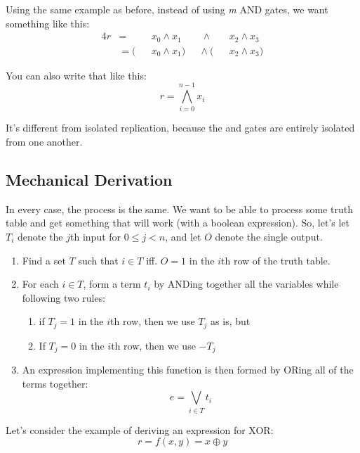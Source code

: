 \documentclass[11pt,a4paper,titlepage,dvipsnames,cmyk]{scrartcl}
\begin{document}
Using the same example as before, instead of using \textit{m} AND gates,
we want something like this:
\begin{alignat*}{4}
    r &= & &x_0 \wedge x_1   &&\ \wedge \ & &x_2 \wedge x_3 \\
      &= (& &x_0 \wedge x_1) &&\wedge \ (& &x_2 \wedge x_3)
\end{alignat*}

You can also write that like this:
\begin{equation*}
    r = \bigwedge^{n-1}_{i=0} x_i
\end{equation*}

It's different from isolated replication, because the and gates are
entirely isolated from one another.

\subsection{Mechanical Derivation}%
\label{sub:mechanical}
In every case, the process is the same. We want to be able to process some
truth table and get something that will work (with a boolean expression).
So, let's let $T_i$ denote the $j$th input for $0 \le j < n$, and let $O$
denote the single output.

\begin{enumerate}
    \item Find a set $T$ such that $i \in T$ iff. $O = 1$ in the $i$th row
        of the truth table.
    \item For each $i \in T$, form a term $t_i$ by ANDing together all the
        variables while following two rules:
        \begin{enumerate}
            \item if $T_j = 1$ in the $i$th row, then we use $T_j$ as is,
                but
            \item If $T_j = 0$ in the $i$th row, then we use $-T_j$
        \end{enumerate}
    \item An expression implementing this function is then formed by ORing
        all of the terms together:
        \begin{equation*}
            e = \bigvee_{i \in T} t_i
        \end{equation*}
\end{enumerate}

Let's consider the example of deriving an expression for XOR:
\begin{equation*}
    r = f(x,y) = x \oplus y
\end{equation*}
\end{document}
